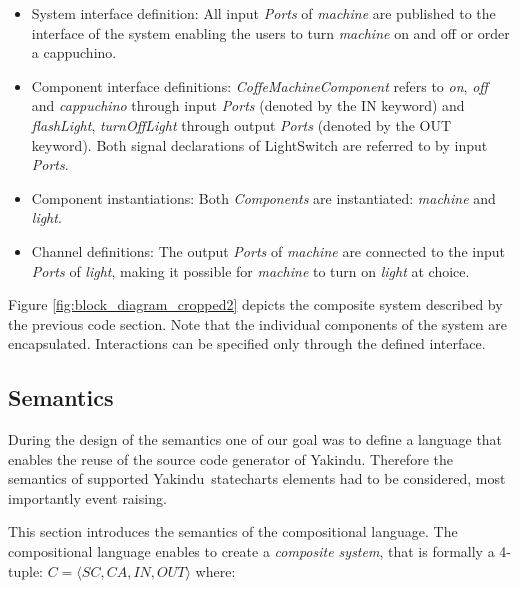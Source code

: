 \documentclass[conference]{IEEEtran}
\newcommand{\Yakindu}{\textsf{Yakindu}}
\begin{document}
\begin{itemize}
	\item System interface definition: All input \textsl{Ports} of \emph{machine} are published to the interface of the system enabling the users to turn \emph{machine} on and off or order a cappuchino.
	
	\item Component interface definitions: \emph{CoffeMachineComponent} refers to \emph{on}, \emph{off} and \emph{cappuchino} through input \textsl{Ports} (denoted by the IN keyword) and \emph{flashLight}, \emph{turnOffLight} through output \textsl{Ports} (denoted by the OUT keyword). Both signal declarations of LightSwitch are referred to by input \textsl{Ports}.
	
	\item Component instantiations: Both \textsl{Components} are instantiated: \emph{machine} and \emph{light}.
	
	\item Channel definitions: The output \textsl{Ports} of \emph{machine} are connected to the input \textsl{Ports} of \emph{light}, making it possible for \emph{machine} to turn on \emph{light} at choice.
\end{itemize}

Figure \ref{fig:block_diagram_cropped2} depicts the composite system described by the previous code section.  Note that the individual components of the system are encapsulated. Interactions can be specified only through the defined interface.

\subsection{Semantics}
\label{sec:semantics}
 During the design of the semantics one of our goal was to define a language that enables the reuse of the source code generator of \Yakindu. Therefore the semantics of supported \Yakindu\ statecharts elements had to be considered, most importantly event raising.

This section introduces the semantics of the compositional language.
The compositional language enables to create a \emph{composite system}, that is formally a 4-tuple: $C = \langle\mathit{SC}, \mathit{CA}, \mathit{IN}, \mathit{OUT}\rangle$ where:
\end{document}
